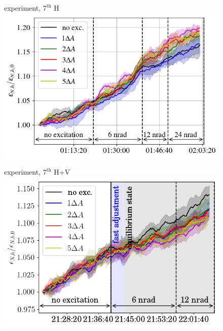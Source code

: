 \documentclass[%
 reprint,
 amsmath,amssymb,
 aps,
prstab,
]{revtex4-1}
\begin{document}
\begin{figure}[h]
	\begin{minipage}[t]{0.49\linewidth}
		 experiment, $7^\mathrm{th}$ H	\includegraphics[width=1.0\linewidth]{2016_emith_avg_rel_h7th_no_damper.png}
	\end{minipage}	
	\begin{minipage}[t]{0.49\linewidth}
		 experiment, $7^\mathrm{th}$ H+V
		\includegraphics[width=1.0\linewidth]{2017_emith_avg_rel_hv7th_no_damper.png}

\end{minipage}
\end{figure}
\end{document}
